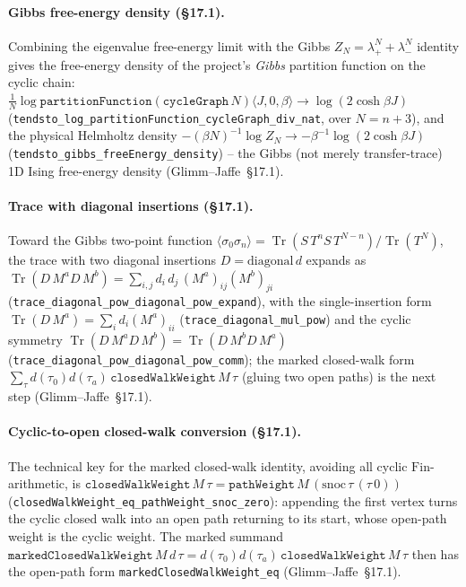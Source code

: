 \documentclass[a4paper,11pt]{article}
\begin{document}
\paragraph{Gibbs free-energy density (\S17.1).}
Combining the eigenvalue free-energy limit with the Gibbs $Z_N = \lambda_+^N + \lambda_-^N$
identity gives the free-energy density of the project's \emph{Gibbs} partition
function on the cyclic chain:
$\tfrac1N \log \texttt{partitionFunction}(\texttt{cycleGraph}\,N)\langle J,0,\beta\rangle \to \log(2\cosh\beta J)$
(\texttt{tendsto\_log\_partitionFunction\_cycleGraph\_div\_nat}, over $N = n{+}3$),
and the physical Helmholtz density
$-(\beta N)^{-1}\log Z_N \to -\beta^{-1}\log(2\cosh\beta J)$
(\texttt{tendsto\_gibbs\_freeEnergy\_density}) -- the Gibbs (not merely
transfer-trace) 1D Ising free-energy density (Glimm--Jaffe~\S17.1).

\paragraph{Trace with diagonal insertions (\S17.1).}
Toward the Gibbs two-point function $\langle\sigma_0\sigma_n\rangle = \operatorname{Tr}(S\,T^n S\,T^{N-n})/\operatorname{Tr}(T^N)$,
the trace with two diagonal insertions $D = \mathrm{diagonal}\,d$ expands as
$\operatorname{Tr}(D\,M^a D\,M^b) = \sum_{i,j} d_i\,d_j\,(M^a)_{ij}(M^b)_{ji}$
(\texttt{trace\_diagonal\_pow\_diagonal\_pow\_expand}), with the single-insertion
form $\operatorname{Tr}(D\,M^a) = \sum_i d_i (M^a)_{ii}$
(\texttt{trace\_diagonal\_mul\_pow}) and the cyclic symmetry
$\operatorname{Tr}(D\,M^a D\,M^b) = \operatorname{Tr}(D\,M^b D\,M^a)$
(\texttt{trace\_diagonal\_pow\_diagonal\_pow\_comm}); the marked closed-walk form
$\sum_\tau d(\tau_0)d(\tau_a)\,\texttt{closedWalkWeight}\,M\,\tau$ (gluing two open
paths) is the next step (Glimm--Jaffe~\S17.1).

\paragraph{Cyclic-to-open closed-walk conversion (\S17.1).}
The technical key for the marked closed-walk identity, avoiding all cyclic
$\mathrm{Fin}$-arithmetic, is
$\texttt{closedWalkWeight}\,M\,\tau = \texttt{pathWeight}\,M\,(\mathrm{snoc}\,\tau\,(\tau\,0))$
(\texttt{closedWalkWeight\_eq\_pathWeight\_snoc\_zero}): appending the first vertex
turns the cyclic closed walk into an open path returning to its start, whose
open-path weight is the cyclic weight. The marked summand
$\texttt{markedClosedWalkWeight}\,M\,d\,\tau = d(\tau_0)d(\tau_a)\,\texttt{closedWalkWeight}\,M\,\tau$
then has the open-path form \texttt{markedClosedWalkWeight\_eq} (Glimm--Jaffe~\S17.1).
\end{document}
